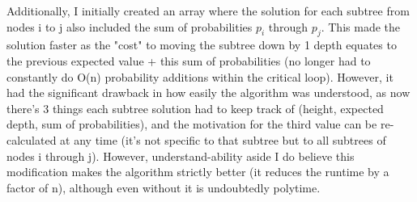 \documentclass[a4paper]{article}
\begin{document}
Additionally, I initially created an array where the solution for each subtree from nodes i to j also included the sum of probabilities $p_i$ through $p_j$. This made the solution faster as the "cost" to moving the subtree down by 1 depth equates to the previous expected value + this sum of probabilities (no longer had to constantly do O(n) probability additions within the critical loop). However, it had the significant drawback in how easily the algorithm was understood, as now there's 3 things each subtree solution had to keep track of (height, expected depth, sum of probabilities), and the motivation for the third value can be re-calculated at any time (it's not specific to that subtree but to all subtrees of nodes i through j). However, understand-ability aside I do believe this modification makes the algorithm strictly better (it reduces the runtime by a factor of n), although even without it is undoubtedly polytime.
\end{document}
